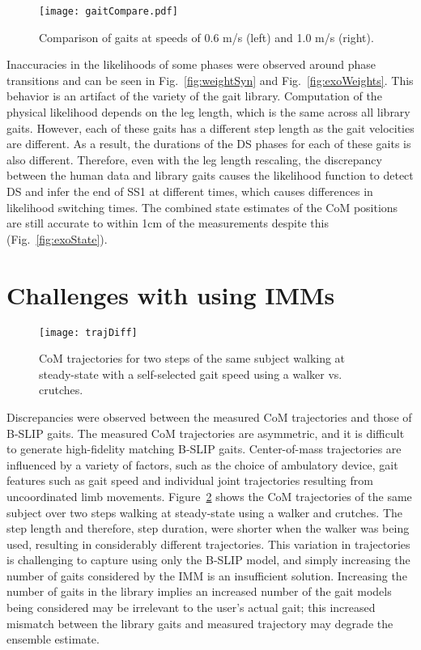 \begin{figure}
	\centering
	\texttt{[image: gaitCompare.pdf]}
	\caption{Comparison of gaits at speeds of 0.6 m/s  (left) and 1.0 m/s  (right).}\label{fig:compare}
\end{figure}

Inaccuracies in the likelihoods of some phases were observed around phase transitions and can be seen in Fig.~\ref{fig:weightSyn} and Fig.~\ref{fig:exoWeights}. This behavior is an artifact of the variety of the gait library. Computation of the physical likelihood depends on the leg length, which is the same across all library gaits. However, each of these gaits has a different step length as the gait velocities are different. As a result, the durations of the DS phases for each of these gaits is also different. Therefore, even with the leg length rescaling, the discrepancy between the human data and library gaits causes the likelihood function to detect DS and infer the end of SS1 at different times, which causes differences in likelihood switching times. The combined state estimates of the CoM positions are still accurate to within 1cm of the measurements despite this (Fig.~\ref{fig:exoState}).

\section{Challenges with using IMMs} \label{sec:challenges}

\begin{figure}
	\centering
	\texttt{[image: trajDiff]}
	\caption{CoM trajectories for two steps of the same subject walking at steady-state with a self-selected gait speed using a walker vs. crutches.}\label{fig:trajDiff}
\end{figure}
Discrepancies were observed between the measured CoM trajectories and those of B-SLIP gaits. The measured CoM trajectories are asymmetric, and it is difficult to generate high-fidelity matching B-SLIP gaits. Center-of-mass trajectories are influenced by a variety of factors, such as the choice of ambulatory device, gait features such as gait speed and individual joint trajectories resulting from uncoordinated limb movements. Figure~\ref{fig:trajDiff} shows the CoM trajectories of the same subject over two steps walking at steady-state using a walker and crutches. The step length and therefore, step duration, were shorter when the walker was being used, resulting in considerably different trajectories. This variation in trajectories is challenging to capture using only the B-SLIP model, and simply increasing the number of gaits considered by the IMM is an insufficient solution. Increasing the number of gaits in the library implies an increased number of the gait models being considered may be irrelevant to the user's actual gait; this increased mismatch between the library gaits and measured trajectory may degrade the ensemble estimate.

